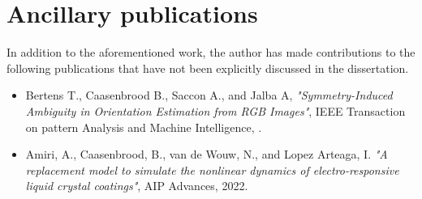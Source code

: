 \section*{Ancillary publications}
In addition to the aforementioned work, the author has made contributions to the following publications that have not been explicitly discussed in the dissertation.
\begin{itemize}[leftmargin=2mm]
\small 
\item Bertens T., Caasenbrood B., Saccon A., and Jalba A, \textit{"Symmetry-Induced Ambiguity in Orientation Estimation from RGB Images"}, IEEE Transaction on pattern Analysis and Machine Intelligence, \sbm.

\item Amiri, A., Caasenbrood, B., van de Wouw, N., and Lopez Arteaga, I. \textit{"A replacement model to simulate the nonlinear dynamics of electro-responsive liquid crystal coatings"}, AIP Advances, 2022.
\end{itemize}

